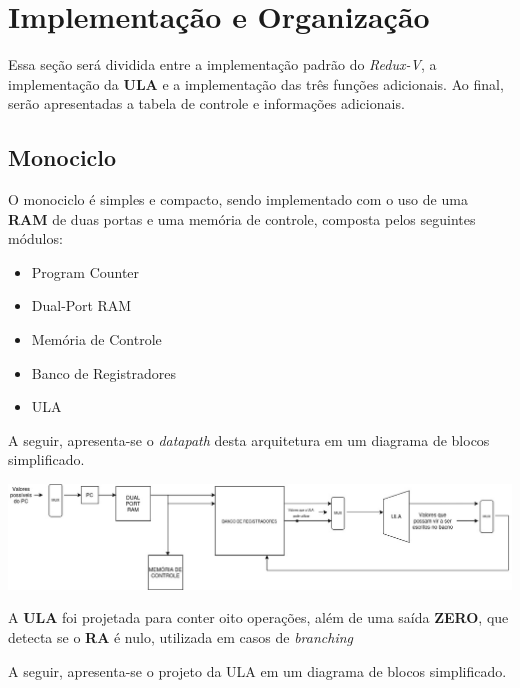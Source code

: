 \documentclass{article}  %
\begin{document}
    \clearpage
    \section{Implementação e Organização}

    Essa seção será dividida entre a implementação padrão do \textit{Redux-V}, a implementação da \textbf{ULA} e a implementação das três funções adicionais. Ao final, serão apresentadas a tabela de controle e informações adicionais.

    \subsection{Monociclo}

    O monociclo é simples e compacto, sendo implementado com o uso de uma \textbf{RAM} de duas portas e uma memória de controle, composta pelos seguintes módulos:

    \begin{itemize}
      \item Program Counter
      \item Dual-Port RAM
      \item Memória de Controle
      \item Banco de Registradores
      \item ULA
    \end{itemize}

    A seguir, apresenta-se o \textit{datapath} desta arquitetura em um diagrama de blocos simplificado.

    \vspace{1cm}
    \noindent\hspace*{-4cm}\includegraphics[scale=0.5]{datapath.jpg}
    \vspace{1cm}

    A \textbf{ULA} foi projetada para conter oito operações, além de uma saída \textbf{ZERO}, que detecta se o \textbf{RA} é nulo, utilizada em casos de \textit{branching}

    A seguir, apresenta-se o projeto da ULA em um diagrama de blocos simplificado.
    
\end{document}
